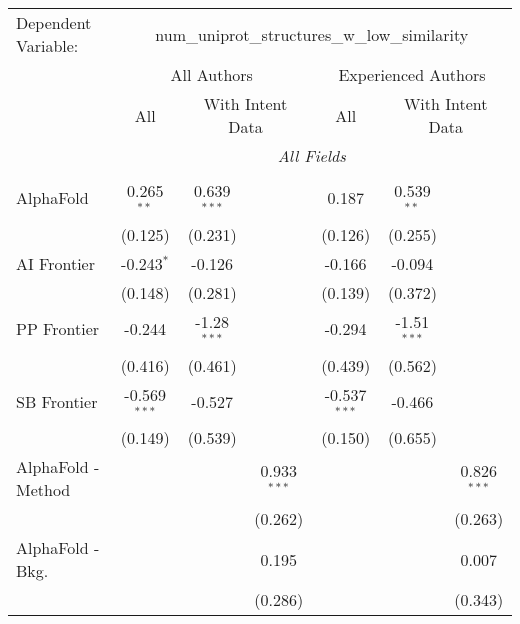 \begingroup
\centering
\begin{tabular}{lcccccc}
   \tabularnewline \midrule \midrule
   Dependent Variable: & \multicolumn{6}{c}{num\_uniprot\_structures\_w\_low\_similarity}\\
 & \multicolumn{3}{c}{All Authors} & \multicolumn{3}{c}{Experienced Authors} \\
\cmidrule(lr){2-4} \cmidrule(lr){5-7}
 & \multicolumn{1}{c}{All} & \multicolumn{2}{c}{With Intent Data} & \multicolumn{1}{c}{All} & \multicolumn{2}{c}{With Intent Data} \\
\cmidrule(lr){2-2} \cmidrule(lr){3-4} \cmidrule(lr){5-5} \cmidrule(lr){6-7}
 & \multicolumn{6}{c}{\textit{All Fields}} \\ \\
   AlphaFold            & 0.265$^{**}$   & 0.639$^{***}$ &               & 0.187          & 0.539$^{**}$  &   \\   
                        & (0.125)        & (0.231)       &               & (0.126)        & (0.255)       &   \\   
   AI Frontier          & -0.243$^{*}$   & -0.126        &               & -0.166         & -0.094        &   \\   
                        & (0.148)        & (0.281)       &               & (0.139)        & (0.372)       &   \\   
   PP Frontier          & -0.244         & -1.28$^{***}$ &               & -0.294         & -1.51$^{***}$ &   \\   
                        & (0.416)        & (0.461)       &               & (0.439)        & (0.562)       &   \\   
   SB Frontier          & -0.569$^{***}$ & -0.527        &               & -0.537$^{***}$ & -0.466        &   \\   
                        & (0.149)        & (0.539)       &               & (0.150)        & (0.655)       &   \\   
   AlphaFold - Method   &                &               & 0.933$^{***}$ &                &               & 0.826$^{***}$\\   
                        &                &               & (0.262)       &                &               & (0.263)\\   
   AlphaFold - Bkg.     &                &               & 0.195         &                &               & 0.007\\   
                        &                &               & (0.286)       &                &               & (0.343)\\   

\end{tabular}
